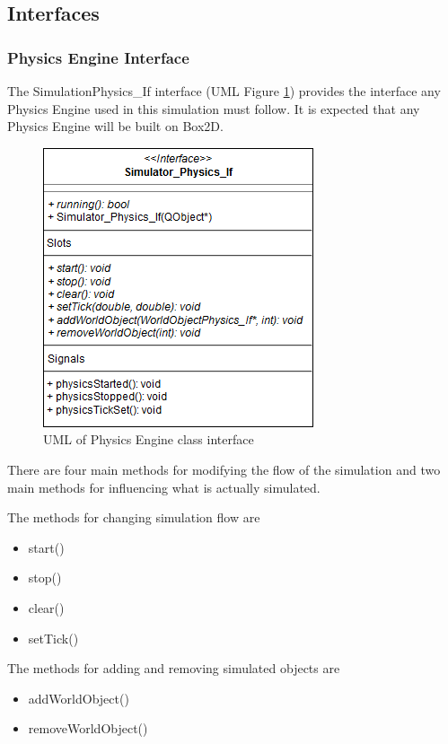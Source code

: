   
  \subsection{Interfaces}
  \subsubsection*{Physics Engine Interface}
  The SimulationPhysics\_If interface (UML Figure \ref{uml:phys_if}) provides the interface any Physics Engine used in this simulation must follow. It is expected that any Physics Engine will be built on Box2D.
  
 \begin{figure}[h]
 	\begin{center}
 	\includegraphics[scale=0.5]{./images_design/uml/Physics_Engine_If}
 	\caption{UML of Physics Engine class interface\label{uml:phys_if}}
 	\end{center}
 \end{figure}  
  
  There are four main methods for modifying the flow of the simulation and two main methods for influencing what is actually simulated.
  
  The methods for changing simulation flow are
  \begin{itemize}
  	\item start()
  	\item stop()
  	\item clear()
  	\item setTick()
  \end{itemize}
  
  The methods for adding and removing simulated objects are
  \begin{itemize}
  	\item addWorldObject()
  	\item removeWorldObject()
  \end{itemize}
  
